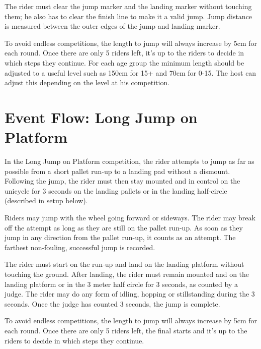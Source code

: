 The rider must clear the jump marker and the landing marker without touching them; he also has to clear the finish line to make it a valid jump.
Jump distance is measured between the outer edges of the jump and landing marker.

To avoid endless competitions, the length to jump will always increase by 5cm for each round.
Once there are only 5 riders left, it's up to the riders to decide in which steps they continue.
For each age group the minimum length should be adjusted to a useful level such as 150cm for 15+ and 70cm for 0-15.
The host can adjust this depending on the level at his competition.

\section{Event Flow: Long Jump on Platform}
In the Long Jump on Platform competition, the rider attempts to jump as far as possible from a short pallet run-up to a landing pad without a dismount.
Following the jump, the rider must then stay mounted and in control on the unicycle for 3 seconds on the landing pallets or in the landing half-circle (described in setup below).

Riders may jump with the wheel going forward or sideways.
The rider may break off the attempt as long as they are still on the pallet run-up.
As soon as they jump in any direction from the pallet run-up, it counts as an attempt.
The farthest non-fouling, successful jump is recorded.

The rider must start on the run-up and land on the landing platform without touching the ground.
After landing, the rider must remain mounted and on the landing platform or in the 3 meter half circle for 3 seconds, as counted by a judge.
The rider may do any form of idling, hopping or stillstanding during the 3 seconds.
Once the judge has counted 3 seconds, the jump is complete.

To avoid endless competitions, the length to jump will always increase by 5cm for each round.
Once there are only 5 riders left, the final starts and it's up to the riders to decide in which steps they continue.
